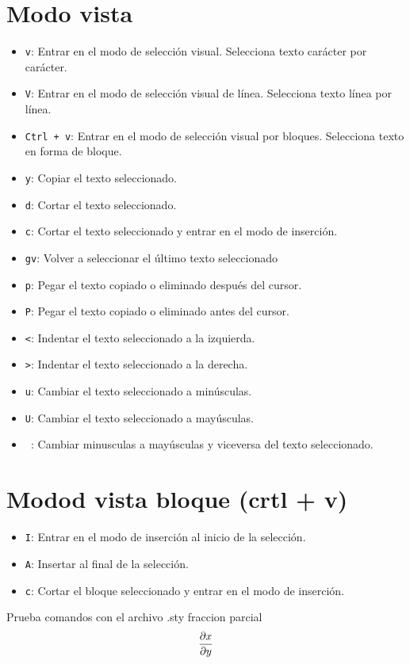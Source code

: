 \documentclass{article}[12pt,a4paper,twoside,utf8,spanish]
\theoremstyle{mytheoremstyle}
\theoremstyle{mytheoremstyle}
\theoremstyle{myproblemstyle}
\begin{document}
\begin{multicols}{2}
    \section{Modo vista }
    \begin{itemize}
        \item \texttt{v}: Entrar en el modo de selección visual. Selecciona texto carácter por carácter.
        \item \texttt{V}: Entrar en el modo de selección visual de línea. Selecciona texto línea por línea.
        \item \texttt{Ctrl + v}: Entrar en el modo de selección visual por bloques. Selecciona texto en forma de bloque.
        \item \texttt{y}: Copiar el texto seleccionado.
        \item \texttt{d}: Cortar el texto seleccionado.
        \item \texttt{c}: Cortar el texto seleccionado y entrar en el modo de inserción.
        \item \texttt{gv}: Volver a seleccionar el último texto seleccionado
        \item \texttt{p}: Pegar el texto copiado o eliminado después del cursor.
        \item \texttt{P}: Pegar el texto copiado o eliminado antes del cursor.
        \item \texttt{<}: Indentar el texto seleccionado a la izquierda.
        \item \texttt{>}: Indentar el texto seleccionado a la derecha.
        \item \texttt{u}: Cambiar el texto seleccionado a minúsculas.
        \item \texttt{U}: Cambiar el texto seleccionado a mayúsculas.
        \item \texttt{~}: Cambiar minusculas a mayúsculas y viceversa del texto seleccionado. 
    \end{itemize}
   \section{Modod vista bloque (crtl + v)}
    \begin{itemize}
        \item \texttt{I}: Entrar en el modo de inserción al inicio de la selección.
        \item \texttt{A}: Insertar al final de la selección.
        \item \texttt{c}: Cortar el bloque seleccionado y entrar en el modo de inserción.
        
    \end{itemize}
    \end{multicols}

Prueba comandos con el archivo .sty 
fraccion parcial 
\[\displaystyle\frac{\partial x}{\partial y}\]
\end{document}
